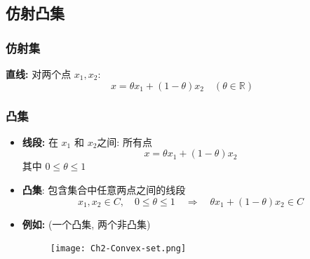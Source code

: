 \documentclass[handout]{beamer}
\begin{document}
\subsection{仿射凸集}
\begin{frame}%
\frametitle{仿射集}%
\textbf{直线:} 对两个点 $x_1, x_2$: 
\begin{equation}
x=\theta x_{1}+(1-\theta) x_{2} \quad(\theta \in \mathbb{R})
\end{equation}



 




\end{frame}
\begin{frame}
\frametitle{凸集}

\begin{itemize}[<+->]
 \item \textbf{线段:} 在 $x_1$ 和 $x_2$之间: 所有点
\begin{equation}
x=\theta x_{1}+(1-\theta) x_{2}
\end{equation}
其中 $0 \leq \theta \leq 1$
\item
\textbf{凸集}: 包含集合中任意两点之间的线段
\begin{equation}
x_{1}, x_{2} \in C, \quad 0 \leq \theta \leq 1 \quad \Longrightarrow \quad \theta x_{1}+(1-\theta) x_{2} \in C
\end{equation}

\item
\textbf{例如:} (一个凸集, 两个非凸集)
\begin{figure}[htbp]
\centering
\texttt{[image: Ch2-Convex-set.png]}
\end{figure}
\end{itemize}

\end{frame}
\end{document}
